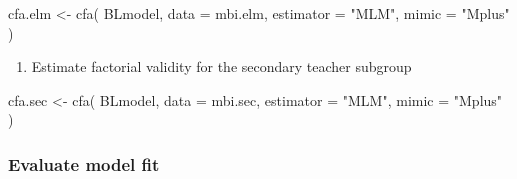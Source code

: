 \documentclass[
]{article}
\newenvironment{Shaded}{\begin{snugshade}}{\end{snugshade}}
\newcommand{\AttributeTok}[1]{\textcolor[rgb]{0.77,0.63,0.00}{#1}}
\newcommand{\FunctionTok}[1]{\textcolor[rgb]{0.00,0.00,0.00}{#1}}
\newcommand{\NormalTok}[1]{#1}
\newcommand{\OtherTok}[1]{\textcolor[rgb]{0.56,0.35,0.01}{#1}}
\newcommand{\StringTok}[1]{\textcolor[rgb]{0.31,0.60,0.02}{#1}}
\providecommand{\tightlist}{%
  \setlength{\itemsep}{0pt}\setlength{\parskip}{0pt}}
\begin{document}
\begin{Shaded}
\begin{Highlighting}[]
\NormalTok{cfa.elm }\OtherTok{\textless{}{-}} 
  \FunctionTok{cfa}\NormalTok{(}
\NormalTok{    BLmodel, }
    \AttributeTok{data =}\NormalTok{ mbi.elm,  }
    \AttributeTok{estimator =} \StringTok{"MLM"}\NormalTok{,}
    \AttributeTok{mimic =} \StringTok{"Mplus"}
\NormalTok{    )}
\end{Highlighting}
\end{Shaded}

\begin{enumerate}
\def\labelenumi{(\arabic{enumi})}
\setcounter{enumi}{1}
\tightlist
\item
  Estimate factorial validity for the secondary teacher subgroup
\end{enumerate}

\begin{Shaded}
\begin{Highlighting}[]
\NormalTok{cfa.sec }\OtherTok{\textless{}{-}} 
  \FunctionTok{cfa}\NormalTok{(}
\NormalTok{    BLmodel, }
    \AttributeTok{data =}\NormalTok{ mbi.sec,  }
    \AttributeTok{estimator =} \StringTok{"MLM"}\NormalTok{,}
    \AttributeTok{mimic =} \StringTok{"Mplus"}
\NormalTok{    )}
\end{Highlighting}
\end{Shaded}

\hypertarget{evaluate-model-fit}{%
\subsubsection{Evaluate model fit}\label{evaluate-model-fit}}
\end{document}
